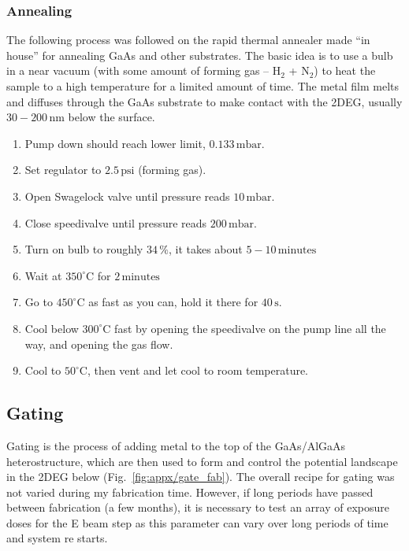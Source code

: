 \subsubsection{Annealing}
The following process was followed on the rapid thermal annealer made “in house” for annealing GaAs and other substrates. The basic idea is to use a bulb in a near vacuum (with some amount of forming gas – $\mathrm{H_2}$ + $\mathrm{N_2}$) to heat the sample to a high temperature for a limited amount of time. The metal film melts and diffuses through the GaAs substrate to make contact with the 2DEG, usually $30-200\,\mathrm{nm}$ below the surface.

\begin{enumerate}
\item Pump down should reach lower limit, $0.133\,\mathrm{mbar}$.
\item Set regulator to $2.5\,\mathrm{psi}$ (forming gas).
\item Open Swagelock valve until pressure reads $10\,\mathrm{mbar}$.
\item Close speedivalve until pressure reads $200\,\mathrm{mbar}$.
\item Turn on bulb to roughly $34\,\%$, it takes about $5-10\,\mathrm{minutes}$
\item Wait at $350^\circ$C for $2\,\mathrm{minutes}$
\item Go to $450^\circ$C as fast as you can, hold it there for $40\,\mathrm{s}$.
\item Cool below $300^\circ$C fast by opening the speedivalve on the pump line all the way, and opening the gas flow.
\item Cool to $50^\circ$C, then vent and let cool to room temperature.
\end{enumerate}


\subsection{Gating}

Gating is the process of adding metal to the top of the GaAs/AlGaAs heterostructure, which are then used to form and control the potential landscape in the 2DEG below (Fig.~\ref{fig:appx/gate_fab}). The overall recipe for gating was not varied during my fabrication time. However, if long periods have passed between fabrication (a few months), it is necessary to test an array of exposure doses for the E beam step as this parameter can vary over long periods of time and system re starts.





